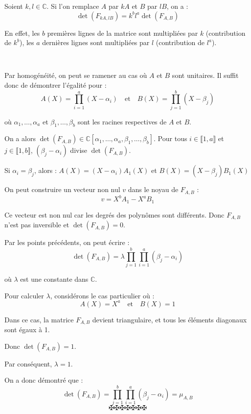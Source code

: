 Soient $k, l \in \mathbb{C}$. Si l'on remplace $A$ par $kA$ et $B$ par $lB$,
on a :
\[ \det (F_{kA, lB}) = k^b l^a \det (F_{A, B}) \]


En effet, les $b$ premi{\`e}res lignes de la matrice sont multipli{\'e}es par
$k$ (contribution de $k^b$), les $a$ derni{\`e}res lignes sont multipli{\'e}es
par $l$ (contribution de $l^a$).

\

Par homog{\'e}n{\'e}it{\'e}, on peut se ramener au cas o{\`u} $A$ et $B$ sont
unitaires. Il suffit donc de d{\'e}montrer l'{\'e}galit{\'e} pour :
\[ A (X) = \prod_{i = 1}^a (X - \alpha_i) \quad \text{et} \quad B (X) =
   \prod_{j = 1}^b (X - \beta_j) \]


o{\`u} $\alpha_1, \ldots, \alpha_a$ et $\beta_1, \ldots, \beta_b$ sont les
racines respectives de $A$ et $B$.

On a alors $\det (F_{A, B}) \in \mathbb{C}[\alpha_1, \ldots, \alpha_a,
\beta_1, \ldots, \beta_b]$. Pour tous $i \in \llbracket 1, a \rrbracket$ et $j
\in \llbracket 1, b \rrbracket$, $(\beta_j - \alpha_i)$ divise $\det (F_{A,
B})$.

Si $\alpha_i = \beta_j$, alors : $A (X) = (X - \alpha_i) A_1 (X)$ et $B (X) =
(X - \beta_j) B_1 (X)$

On peut construire un vecteur non nul $v$ dans le noyau de $F_{A, B}$ :
\[ v = X^b A_1 - X^a B_1 \]


Ce vecteur est non nul car les degr{\'e}s des polyn{\^o}mes sont
diff{\'e}rents. Donc $F_{A, B}$ n'est pas inversible et $\det (F_{A, B}) = 0$.

Par les points pr{\'e}c{\'e}dents, on peut {\'e}crire :
\[ \det (F_{A, B}) = \lambda \prod_{j = 1}^b \prod_{i = 1}^a (\beta_j -
   \alpha_i) \]


o{\`u} $\lambda$ est une constante dans $\mathbb{C}$.

Pour calculer $\lambda$, consid{\'e}rons le cas particulier o{\`u} :
\[ A (X) = X^a  \quad \text{et} \quad B (X) = 1 \]


Dans ce cas, la matrice $F_{A, B}$ devient triangulaire, et tous les
{\'e}l{\'e}ments diagonaux sont {\'e}gaux {\`a} 1.

Donc $\det (F_{A, B}) = 1$.

Par cons{\'e}quent, $\lambda = 1$.

On a donc d{\'e}montr{\'e} que :
\[ \det (F_{A, B}) = \prod_{j = 1}^b \prod_{i = 1}^a (\beta_j - \alpha_i) =
   \mu_{A, B} \]
\[ \maltese \maltese \maltese \maltese \maltese \maltese \maltese \]
